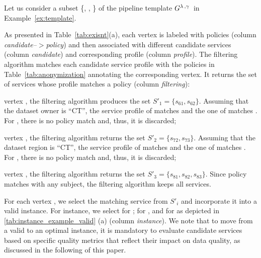 
\begin{example}[\bf \pipelineInstance]\label{ex:instance}

  Let us consider a subset \{, , \} of the pipeline template $G^{\lambda\,,\gamma\,}$ in Example~\ref{ex:template}.

  As presented in Table~\ref{tab:exisnt}(a), each vertex is labeled with policies (column \emph{candidate--$>$policy}) and then associated with different candidate services (column \emph{candidate}) and corresponding profile (column \emph{profile}). The filtering algorithm matches each candidate service profile with the policies in Table~\ref{tab:anonymization} annotating the corresponding vertex. It returns the set of services whose profile matches a policy (column \emph{filtering}):
  \begin{enumerate*}[label=\textit{\roman*})]
    \item vertex , the filtering algorithm produces the set $S'_1=\{s_{61},s_{62}\}$. Assuming that the dataset owner is ``CT'', the service profile of  matches  and the one of  matches . For , there is no policy match and, thus, it is discarded;
    \item vertex , the filtering algorithm returns the set $S'_2=\{s_{72},s_{73}\}$. Assuming that the dataset region is ``CT'', the service profile of  matches  and the one of  matches . For , there is no policy match and, thus, it is discarded;
    \item vertex , the filtering algorithm returns the set $S'_3=\{s_{81},s_{82},s_{83}\}$. Since policy  matches with any subject, the filtering algorithm keeps all services.
  \end{enumerate*}

  For each vertex , we select the matching service  from $S'_i$ and incorporate it into a valid instance. For instance, we select  for ;  for , and  for 
  as depicted in \cref{tab:instance_example_valid} (a) (column \emph{instance}). We note that to move from a valid to an optimal instance, it is mandatory to evaluate candidate services based on specific quality metrics that reflect their impact on data quality, as discussed in the following of this paper. 


\end{example}
